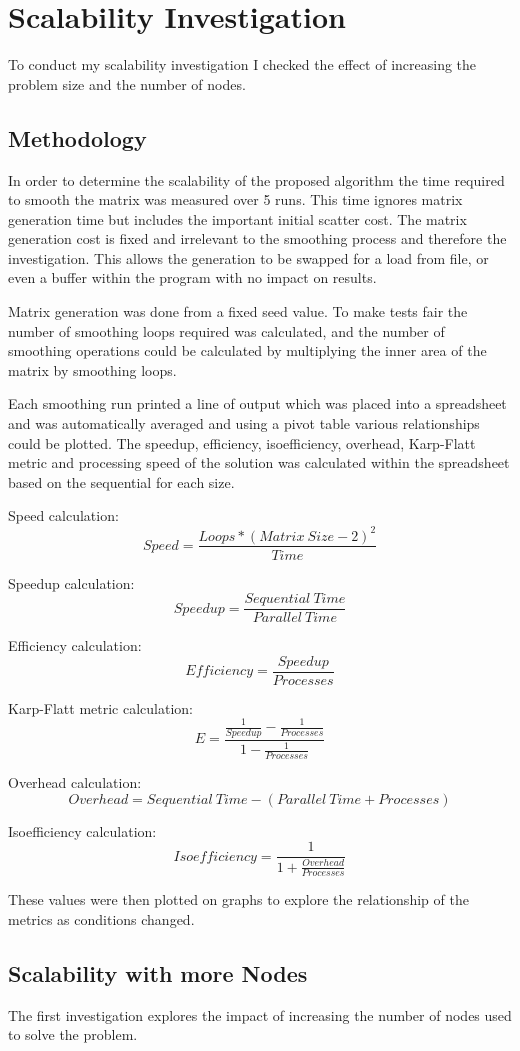 \documentclass[a4paper,10pt]{report}
\begin{document}
\section{Scalability Investigation}
To conduct my scalability investigation I checked the effect of increasing the problem size and the number of nodes.
\subsection{Methodology}
In order to determine the scalability of the proposed algorithm the time required to smooth the matrix was measured over 5 runs. This time ignores matrix generation time but includes the important initial scatter cost. The matrix generation cost is fixed and irrelevant to the smoothing process and therefore the investigation. This allows the generation to be swapped for a load from file, or even a buffer within the program with no impact on results.

Matrix generation was done from a fixed seed value. To make tests fair the number of smoothing loops required was calculated, and the number of smoothing operations could be calculated by multiplying the inner area of the matrix by smoothing loops.

Each smoothing run printed a line of output which was placed into a spreadsheet and was automatically averaged and using a pivot table various relationships could be plotted. The speedup, efficiency, isoefficiency, overhead, Karp-Flatt metric and processing speed of the solution was calculated within the spreadsheet based on the sequential for each size.

Speed calculation: $$Speed = \frac{Loops * (Matrix\ Size - 2)^2}{Time}$$

Speedup calculation: $$Speedup = \frac{Sequential\ Time}{Parallel\ Time}$$

Efficiency calculation: $$Efficiency = \frac{Speedup}{Processes}$$

Karp-Flatt metric calculation: $$E = \frac{\frac{1}{Speedup} - \frac{1}{Processes}}{1 - \frac{1}{Processes}}$$

Overhead calculation: $$Overhead = Sequential\ Time - (Parallel\ Time + Processes)$$

Isoefficiency calculation: $$Isoefficiency = \frac{1}{1 + \frac{Overhead}{Processes}}$$

These values were then plotted on graphs to explore the relationship of the metrics as conditions changed.
\subsection{Scalability with more Nodes}
The first investigation explores the impact of increasing the number of nodes used to solve the problem.
\end{document}
